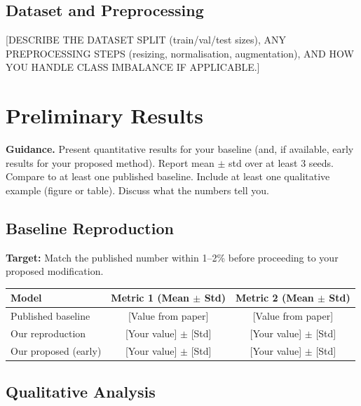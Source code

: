 \documentclass[11pt, letterpaper]{article}
\begin{document}
\subsection{Dataset and Preprocessing}

[DESCRIBE THE DATASET SPLIT (train/val/test sizes), ANY PREPROCESSING STEPS
(resizing, normalisation, augmentation), AND HOW YOU HANDLE CLASS IMBALANCE
IF APPLICABLE.]

\section{Preliminary Results}

\begin{guidancebox}
\textbf{Guidance.} Present quantitative results for your baseline (and, if
available, early results for your proposed method). Report mean $\pm$ std over
at least 3 seeds. Compare to at least one published baseline. Include at least
one qualitative example (figure or table). Discuss what the numbers tell you.
\end{guidancebox}

\subsection{Baseline Reproduction}

\begin{notebox}
\textbf{Target:} Match the published number within 1--2\% before proceeding
to your proposed modification.
\end{notebox}

\begin{center}
\begin{tabular}{lcc}
\toprule
\textbf{Model} & \textbf{Metric 1 (Mean $\pm$ Std)} & \textbf{Metric 2 (Mean $\pm$ Std)} \\
\midrule
Published baseline & [Value from paper] & [Value from paper] \\
Our reproduction & [Your value] $\pm$ [Std] & [Your value] $\pm$ [Std] \\
Our proposed (early) & [Your value] $\pm$ [Std] & [Your value] $\pm$ [Std] \\
\bottomrule
\end{tabular}
\end{center}

\subsection{Qualitative Analysis}
\end{document}
